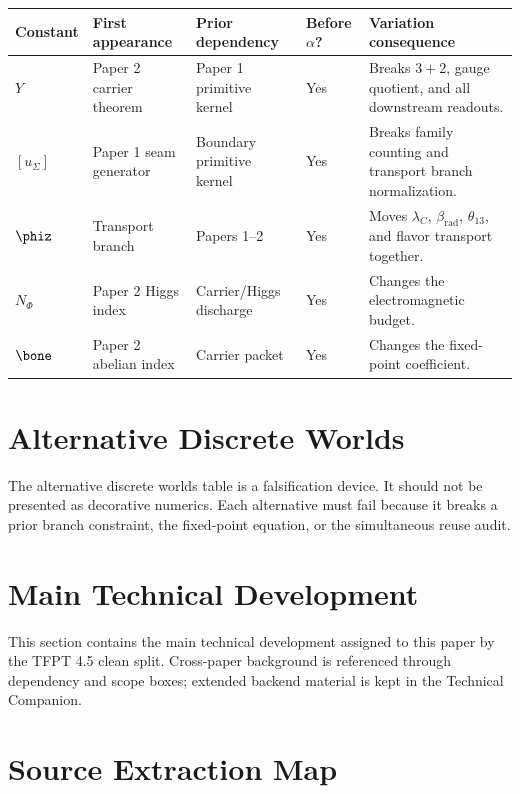 \begin{center}
\begin{tabularx}{\textwidth}{@{}p{}p{}p{}p{}Y@{}}
\toprule
\textbf{Constant} & \textbf{First appearance} & \textbf{Prior dependency} & \textbf{Before $\alpha$?} & \textbf{Variation consequence} \\
\midrule
$Y$ & Paper 2 carrier theorem & Paper 1 primitive kernel & Yes & Breaks $3+2$, gauge quotient, and all downstream readouts. \\
$[u_\Sigma]$ & Paper 1 seam generator & Boundary primitive kernel & Yes & Breaks family counting and transport branch normalization. \\
$\phiz$ & Transport branch & Papers 1--2 & Yes & Moves $\lambda_C$, $\beta_{\mathrm{rad}}$, $\theta_{13}$, and flavor transport together. \\
$N_\Phi$ & Paper 2 Higgs index & Carrier/Higgs discharge & Yes & Changes the electromagnetic budget. \\
$\bone$ & Paper 2 abelian index & Carrier packet & Yes & Changes the fixed-point coefficient. \\
\bottomrule
\end{tabularx}
\end{center}

\section{Alternative Discrete Worlds}

The alternative discrete worlds table is a falsification device. It should not be presented as
decorative numerics. Each alternative must fail because it breaks a prior branch constraint, the
fixed-point equation, or the simultaneous reuse audit.

\clearpage
\section{Main Technical Development}

This section contains the main technical development assigned to this paper by the TFPT 4.5 clean split. Cross-paper background is referenced through dependency and scope boxes; extended backend material is kept in the Technical Companion.



\section{Source Extraction Map}

